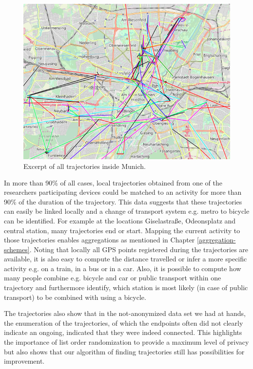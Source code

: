 \begin{figure}[h!]
	\includegraphics[width=\textwidth]{data/trajectories-3.png}
	\caption{Excerpt of all trajectories inside Munich.}
	\label{trajectories2}
\end{figure}

In more than 90\% of all cases, local trajectories obtained from one of the researchers participating devices could be matched to an activity for more than 90\% of the duration of the trajectory. This data suggests that these trajectories can easily be linked locally and a change of transport system e.g. metro to bicycle can be identified. For example at the locations Giselastraße, Odeonsplatz and central station, many trajectories end or start. Mapping the current activity to those trajectories enables aggregations as mentioned in Chapter \ref{aggregation-schemes}. Noting that locally all GPS points registered during the trajectories are available, it is also easy to compute the distance travelled or infer a more specific activity e.g. on a train, in a bus or in a car. Also, it is possible to compute how many people combine e.g. bicycle and car or public transport within one trajectory and furthermore identify, which station is most likely (in case of public transport) to be combined with using a bicycle.

The trajectories also show that in the not-anonymized data set we had at hands, the enumeration of the trajectories, of which the endpoints often did not clearly indicate an ongoing, indicated that they were indeed connected. This highlights the importance of list order randomization to provide a maximum level of privacy but also shows that our algorithm of finding trajectories still has possibilities for improvement.

